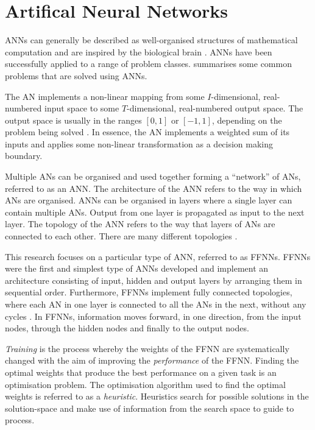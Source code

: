 \section{Artifical Neural Networks}
\label{sec:anns}

\acp{ANN} can generally be described as well-organised structures of mathematical computation and are inspired by the biological brain \cite{ref:engelbrecht:2007}. \acp{ANN} have been successfully applied to a range of problem classes. \citeauthor{ref:engelbrecht:2007} \cite{ref:engelbrecht:2007} summarises some common problems that are solved using \acp{ANN}.

The \acs{AN} implements a non-linear mapping from some $I$-dimensional, real-numbered input space to some $T$-dimensional, real-numbered output space. The output space is usually in the ranges $[0,1]$ or $[-1,1]$, depending on the problem being solved \cite{ref:engelbrecht:2007}. In essence, the \acs{AN} implements a weighted sum of its inputs and applies some non-linear transformation as a decision making boundary.

Multiple \acp{AN} can be organised and used together forming a ``network'' of \acp{AN}, referred to as an \acs{ANN}. The architecture of the \acs{ANN} refers to the way in which \acp{AN} are organised. \acp{ANN} can be organised in layers where a single layer can contain multiple \acp{AN}. Output from one layer is propagated as input to the next layer. The topology of the \acs{ANN} refers to the way that layers of \acp{AN} are connected to each other. There are many different topologies \cite{ref:miikkulainen:2010}.

This research focuses on a particular type of \acs{ANN}, referred to as \acfp{FFNN}. \acp{FFNN} were the first and simplest type of \acp{ANN} developed \cite{ref:schmidhuber:2015} and implement an architecture consisting of input, hidden and output layers by arranging them in sequential order. Furthermore, \acp{FFNN} implement fully connected topologies, where each \acs{AN} in one layer is connected to all the \acp{AN} in the next, without any cycles \cite{ref:zell:1994}. In \acp{FFNN}, information moves forward, in one direction, from the input nodes, through the hidden nodes and finally to the output nodes.

\textit{Training} is the process whereby the weights of the \acs{FFNN} are systematically changed with the aim of improving the \textit{performance} of the \acs{FFNN}. Finding the optimal weights that produce the best performance on a given task is an optimisation problem. The optimisation algorithm used to find the optimal weights is referred to as a \textit{heuristic}. Heuristics search for possible solutions in the solution-space and make use of information from the search space to guide to process.

